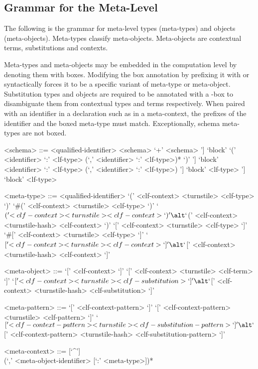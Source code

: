 \subsection{Grammar for the Meta-Level}\label{section:syntax-meta-level}

The following is the grammar for meta-level types (meta-types) and objects (meta-objects).
Meta-types classify meta-objects.
Meta-objects are contextual \LF terms, substitutions and contexts.

Meta-types and meta-objects may be embedded in the computation level by denoting them with boxes.
Modifying the box annotation by prefixing it with \syntax{\#} or \syntax{\$} syntactically forces it to be a specific variant of meta-type or meta-object.
Substitution types and objects are required to be annotated with a \syntax{\$}-box to disambiguate them from contextual types and terms respectively.
When paired with an identifier in a declaration such as in a meta-context, the prefixes of the identifier and the boxed meta-type must match.
Exceptionally, schema meta-types are not boxed.

\begin{grammar}
<schema> ::= <qualified-identifier>
\alt <schema> `+' <schema>
\alt [`some' `[' <identifier> `:' <lf-type> (`,' <identifier> `:' <lf-type>)* `]'] `block' `(' <identifier> `:' <lf-type> (`,' <identifier> `:' <lf-type>)* `)'
\alt [`some' `[' <identifier> `:' <lf-type> (`,' <identifier> `:' <lf-type>)* `]'] `block' <identifier> `:' <lf-type> (`,' <identifier> `:' <lf-type>)
\alt [`some' `[' <identifier> `:' <lf-type> (`,' <identifier> `:' <lf-type>)* `]'] `block' <lf-type>
\alt [`some' `[' <identifier> `:' <lf-type> (`,' <identifier> `:' <lf-type>)* `]'] `block' <lf-type>

<meta-type> ::= <qualified-identifier>
\alt `(' <clf-context> <turnstile> <clf-type> `)'
\alt `#(' <clf-context> <turnstile> <clf-type> `)'
\alt `$(' <clf-context> <turnstile> <clf-context> `)'
\alt `$(' <clf-context> <turnstile-hash> <clf-context> `)'
\alt `[' <clf-context> <turnstile> <clf-type> `]'
\alt `#[' <clf-context> <turnstile> <clf-type> `]'
\alt `$[' <clf-context> <turnstile> <clf-context> `]'
\alt `$[' <clf-context> <turnstile-hash> <clf-context> `]'

<meta-object> ::= `[' <clf-context> `]'
\alt `[' <clf-context> <turnstile> <clf-term> `]'
\alt `$[' <clf-context> <turnstile> <clf-substitution> `]'
\alt `$[' <clf-context> <turnstile-hash> <clf-substitution> `]'

<meta-pattern> ::= `[' <clf-context-pattern> `]'
\alt `[' <clf-context-pattern> <turnstile> <clf-pattern> `]'
\alt `$[' <clf-context-pattern> <turnstile> <clf-substitution-pattern> `]'
\alt `$[' <clf-context-pattern> <turnstile-hash> <clf-substitution-pattern> `]'

<meta-context> ::= [`^']
\\
(`,' <meta-object-identifier> [`:' <meta-type>])*
\end{grammar}

